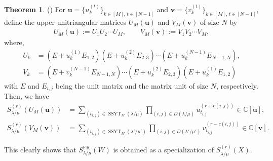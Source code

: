 \documentclass[12pt]{amsart}%
\theoremstyle{definition}
\newtheorem{theorem}{Theorem}[section]
\DeclareMathOperator{\SSYT}{SSYT}
\newcommand{\bu}{\boldsymbol u}
\newcommand{\bv}{\boldsymbol v}
\newcommand{\FK}{\mathrm{FK}}
\begin{document}
\begin{theorem}
\label{thm:nnsy special}
({\cite[(2.59) and (2.64)]{nnsy}})
For $\bu=\{u^{(t)}_k\}_{k\in [M],\,t\in [N-1]}$ and $\bv=\{v^{(t)}_k\}_{k\in [M],\,t\in [N-1]}$, 
define the upper unitriangular matrices  
$U_M(\bu)$ and $V_M(\bv)$ of size $N$ by 
\begin{align*}
U_M(\bu):=U_1U_2\cdots U_M,
\qquad
V_M(\bv):=V_1V_2\cdots V_M,   
\end{align*}
where, 
\begin{align*}
 U_k
&=(E+u^{(1)}_{k}E_{1,2})(E+u^{(2)}_{k}E_{2,3})\cdots (E+u^{(N-1)}_{k}E_{N-1,N}),\\
 V_k
&=(E+v^{(N-1)}_{k}E_{N-1,N})\cdots (E+u^{(2)}_{k}E_{2,3})(E+u^{(1)}_{k}E_{1,2})
\end{align*}
with $E$ and $E_{i,j}$ being the unit matrix and the matrix unit of size $N$, respectively.
Then, we have 
\begin{align}
\label{for:tableau_U}
 S^{(r)}_{\lambda/\mu}(U_M(\bu))
&=\sum_{(t_{i,j})\in \SSYT_M(\lambda/\mu)}\prod_{(i,j)\in D(\lambda/\mu)}u^{(r+c(i,j))}_{t_{i,j}}\in \mathbb{C}[\bu], \\
\label{for:tableau_V}
  S^{(r)}_{\lambda/\mu}(V_M(\bv))
&=\sum_{(t_{i,j})\in \SSYT_M(\lambda'/\mu')}\prod_{(i,j)\in D(\lambda'/\mu')}v^{(r-c(i,j))}_{t_{i,j}}\in \mathbb{C}[\bv].
\end{align}
\end{theorem}

This clearly shows that 
$S^{\FK}_{\lambda/\mu}(W)$ 
is obtained as a specialization of $S^{(r)}_{\lambda/\mu}(X)$.
\end{document}
